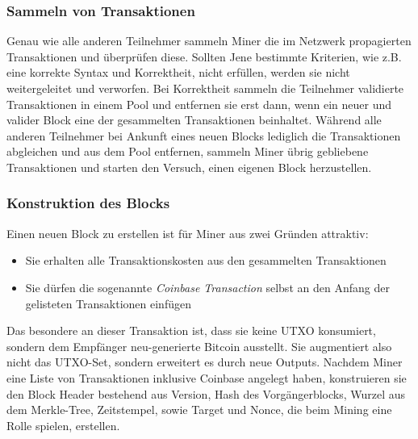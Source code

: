 \subsubsection{Sammeln von Transaktionen}
Genau wie alle anderen Teilnehmer sammeln Miner die im Netzwerk propagierten Transaktionen und überprüfen diese. Sollten Jene bestimmte Kriterien, wie z.B. eine korrekte Syntax und Korrektheit, nicht erfüllen, werden sie nicht weitergeleitet und verworfen.
Bei Korrektheit sammeln die Teilnehmer validierte Transaktionen in einem Pool und entfernen sie erst dann, wenn ein neuer und valider Block eine der gesammelten Transaktionen beinhaltet. 
Während alle anderen Teilnehmer bei Ankunft eines neuen Blocks lediglich die Transaktionen abgleichen und aus dem Pool entfernen, sammeln Miner übrig gebliebene Transaktionen und starten den Versuch, einen eigenen Block herzustellen.
\subsubsection{Konstruktion des Blocks}
Einen neuen Block zu erstellen ist für Miner aus zwei Gründen attraktiv:
\begin{itemize}
\item Sie erhalten alle Transaktionskosten aus den gesammelten Transaktionen
\item Sie dürfen die sogenannte \emph{Coinbase Transaction} selbst an den Anfang der gelisteten Transaktionen einfügen
\end{itemize}
Das besondere an dieser Transaktion ist, dass sie keine UTXO konsumiert, sondern dem Empfänger neu-generierte Bitcoin ausstellt. Sie augmentiert also nicht das UTXO-Set, sondern erweitert es durch neue Outputs.
Nachdem Miner eine Liste von Transaktionen inklusive Coinbase angelegt haben, konstruieren sie den Block Header bestehend aus Version, Hash des Vorgängerblocks, Wurzel aus dem Merkle-Tree, Zeitstempel, sowie Target und Nonce, die beim Mining eine Rolle spielen, erstellen.
